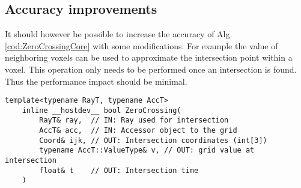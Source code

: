 \subsection{Accuracy improvements}

It should however be possible to increase the accuracy of Alg. \ref{cod:ZeroCrossingCore} with some modifications.
For example the value of neighboring voxels can be used to approximate the intersection point within a voxel.
This operation only needs to be performed once an intersection is found. Thus the performance impact should be minimal.

\begin{lstlisting}[caption={Footprint of NanoVDB's raytracing function. Types for coordinates (ijk) and time (t) are hardcoded. The function returns false if no intersection has been detected}]
    template<typename RayT, typename AccT>
    inline __hostdev__ bool ZeroCrossing(
        RayT& ray,  // IN: Ray used for intersection
        AccT& acc,  // IN: Accessor object to the grid
        Coord& ijk, // OUT: Intersection coordinates (int[3])
        typename AccT::ValueType& v, // OUT: grid value at intersection
        float& t    // OUT: Intersection time
    )
    \end{lstlisting}
    \label{cod:ZeroCrossing}







